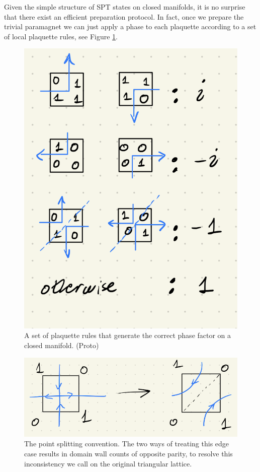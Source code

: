 \documentclass[a4paper,twocolumn,11pt]{quantumarticle}
\begin{document}
Given the simple structure of SPT states on closed manifolds, it is no surprise that there exist an efficient preparation protocol. In fact, once we prepare the trivial paramagnet we can just apply a phase to each plaquette according to a set of local plaquette rules, see Figure \ref{fig:plaq}.\begin{figure}
\centering
\includegraphics[width=\linewidth]{Figures/plaq_rules.png}
\caption{A set of plaquette rules that generate the correct phase factor on a closed manifold. (Proto)}
\label{fig:plaq}
\end{figure}
\begin{figure}
\centering
\includegraphics[width=\linewidth]{Figures/point_split.png}
\caption{The point splitting convention. The two ways of treating this edge case results in domain wall counts of opposite parity, to resolve this inconsistency we call on the original triangular lattice.}
\label{fig:point_split}
\end{figure}
\end{document}
